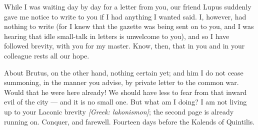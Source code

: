

 While I was waiting day by day for a letter from you, our friend Lupus suddenly gave me notice to write to you if I had anything I wanted said. I, however, had nothing to write (for I knew that the gazette was being sent on to you, and I was hearing that idle small-talk in letters is unwelcome to you), and so I have followed brevity, with you for my master. Know, then, that in you and in your colleague rests all our hope.

 About Brutus, on the other hand, nothing certain yet; and him I do not cease summoning, in the manner you advise, by private letter to the common war. Would that he were here already! We should have less to fear from that inward evil of the city --- and it is no small one. But what am I doing? I am not living up to your Laconic brevity \textit{[Greek: lakonismon]}; the second page is already running on. Conquer, and farewell. Fourteen days before the Kalends of Quintilis.
